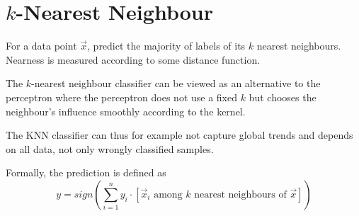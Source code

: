 \section{$k$-Nearest Neighbour}
For a data point $\vec{x}$,
predict the majority of labels of its
$k$ nearest neighbours.
Nearness is measured according to some
distance function.

The $k$-nearest neighbour classifier can be
viewed as an alternative to the perceptron
where the perceptron does not use a fixed
$k$ but chooses the neighbour's influence
smoothly according to the kernel.

The KNN classifier can thus for example
not capture global trends and depends on
all data, not only wrongly classified samples.

Formally, the prediction is defined as
\begin{equation*}
    y = sign\left(
        \sum_{i=1}^n{y_i \cdot
            [\text{$\vec{x}_i$ among $k$ nearest neighbours of $\vec{x}$}]
        }
    \right)
\end{equation*}
